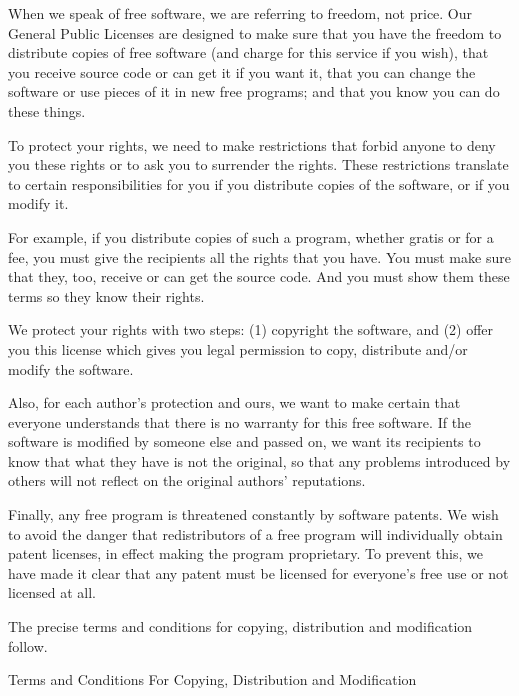 \documentclass[12pt,a4paper]{article}
\begin{document}
When we speak of free software, we are referring to freedom, not price.
Our General Public Licenses are designed to make sure that you have the
freedom to distribute copies of free software (and charge for this service
if you wish), that you receive source code or can get it if you want it,
that you can change the software or use pieces of it in new free programs;
and that you know you can do these things.

To protect your rights, we need to make restrictions that forbid anyone to
deny you these rights or to ask you to surrender the rights.  These
restrictions translate to certain responsibilities for you if you
distribute copies of the software, or if you modify it.

For example, if you distribute copies of such a program, whether gratis or
for a fee, you must give the recipients all the rights that you have.  You
must make sure that they, too, receive or can get the source code.  And
you must show them these terms so they know their rights.

We protect your rights with two steps: (1) copyright the software, and (2)
offer you this license which gives you legal permission to copy,
distribute and/or modify the software.

Also, for each author's protection and ours, we want to make certain that
everyone understands that there is no warranty for this free software.  If
the software is modified by someone else and passed on, we want its
recipients to know that what they have is not the original, so that any
problems introduced by others will not reflect on the original authors'
reputations.

Finally, any free program is threatened constantly by software patents.
We wish to avoid the danger that redistributors of a free program will
individually obtain patent licenses, in effect making the program
proprietary.  To prevent this, we have made it clear that any patent must
be licensed for everyone's free use or not licensed at all.

The precise terms and conditions for copying, distribution and
modification follow.

\begin{center}
{\Large \sc Terms and Conditions For Copying, Distribution and
  Modification}
\end{center}
\end{document}
